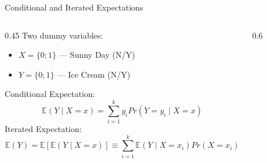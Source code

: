 \documentclass[notes,10pt, aspectratio=169]{beamer}
\begin{document}
\begin{frame}{Conditional and Iterated Expectations}
 \begin{columns}
\begin{column}{0.45\textwidth}
Two dummy variables:
    \begin{itemize}
    \item $X = \{0;1\}$ --- Sunny Day (N/Y)
    \item $Y = \{0;1\}$ --- Ice Cream (N/Y)
    \end{itemize}
\vspace{.5cm}
Conditional Expectation:
\begin{equation*}
    \mathbb{E}(Y\mid X=x)= \sum^k_{i=1} y_i  Pr(Y=y_i \mid X=x)
\end{equation*}
Iterated Expectation:
\begin{equation*}
    \mathbb{E}(Y)=\mathbb{E}[\mathbb{E}(Y\mid X=x)] \equiv \sum^k_{i=1} \mathbb{E}(Y\mid X=x_i) Pr(X=x_i)
\end{equation*}

\end{column}
\begin{column}{0.6\textwidth}
\begin{figure}
        \begin{table}
        \end{table}
\vspace{1cm}
\end{figure}
\end{column}
\end{columns}
\end{frame}
\end{document}
